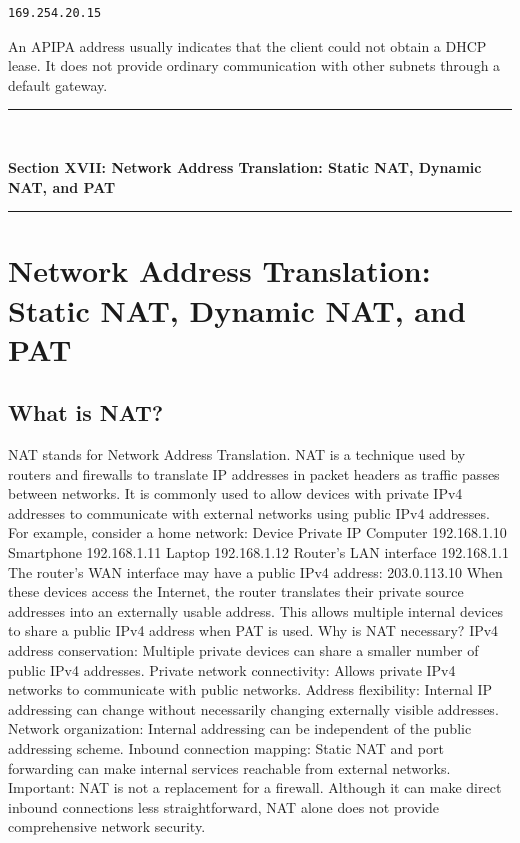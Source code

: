 \begin{lstlisting}
169.254.20.15
\end{lstlisting}

An APIPA address usually indicates that the client could not obtain a DHCP lease. It does not provide ordinary communication with other subnets through a default gateway.


\newpage
\begin{center}
\vspace{0.5em}
{\color{primary}\rule{0.45\textwidth}{1.2pt}\\[4pt]}
{\Large\bfseries\color{primary} Section XVII: Network Address Translation: Static NAT, Dynamic NAT, and PAT\\[2pt]}
{\color{primary}\rule{0.45\textwidth}{1.2pt}}
\vspace{0.5em}
\end{center}

\section{Network Address Translation: Static NAT, Dynamic NAT, and PAT}

\subsection{What is NAT?}
NAT stands for Network Address Translation.
NAT is a technique used by routers and firewalls to translate IP addresses in packet headers as traffic passes between networks.
It is commonly used to allow devices with private IPv4 addresses to communicate with external networks using public IPv4 addresses.
For example, consider a home network:
Device
Private IP
Computer
192.168.1.10
Smartphone
192.168.1.11
Laptop
192.168.1.12
Router's LAN interface
192.168.1.1
The router's WAN interface may have a public IPv4 address:
203.0.113.10
When these devices access the Internet, the router translates their private source addresses into an externally usable address.
This allows multiple internal devices to share a public IPv4 address when PAT is used.
Why is NAT necessary?
IPv4 address conservation: Multiple private devices can share a smaller number of public IPv4 addresses.
Private network connectivity: Allows private IPv4 networks to communicate with public networks.
Address flexibility: Internal IP addressing can change without necessarily changing externally visible addresses.
Network organization: Internal addressing can be independent of the public addressing scheme.
Inbound connection mapping: Static NAT and port forwarding can make internal services reachable from external networks.
Important: NAT is not a replacement for a firewall. Although it can make direct inbound connections less straightforward, NAT alone does not provide comprehensive network security.
